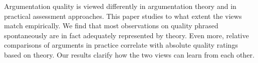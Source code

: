 Argumentation quality is viewed differently in argumentation theory and in practical assessment approaches. This paper studies to what extent the views match empirically. We find that most observations on quality phrased spontaneously are in fact adequately represented by theory. Even more, relative comparisons of arguments in practice correlate with absolute quality ratings based on theory. Our results clarify how the two views can learn from each other.
